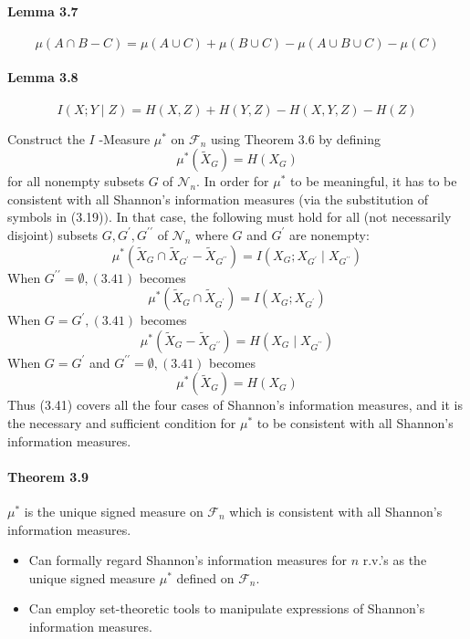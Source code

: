 \documentclass[8pt]{article}
\begin{document}
\paragraph{Lemma 3.7}
$$
\mu(A \cap B-C)=\mu(A \cup C)+\mu(B \cup C)-\mu(A \cup B \cup C)-\mu(C)
$$
\paragraph{Lemma 3.8}
$$
I(X ; Y \mid Z)=H(X, Z)+H(Y, Z)-H(X, Y, Z)-H(Z)
$$

\begin{tcolorbox}
Construct the $I$ -Measure $\mu^{*}$ on $\mathcal{F}_{n}$ using Theorem 3.6 by defining
$$
\mu^{*}\left(\tilde{X}_{G}\right)=H\left(X_{G}\right)
$$
for all nonempty subsets $G$ of $\mathcal{N}_{n} .$ In order for $\mu^{*}$ to be meaningful, it has to be consistent with all Shannon's information measures (via the substitution of symbols in (3.19)$)$. In that case, the following must hold for all (not necessarily disjoint) subsets $G, G^{\prime}, G^{\prime \prime}$ of $\mathcal{N}_{n}$ where $G$ and $G^{\prime}$ are nonempty:
$$
\mu^{*}\left(\tilde{X}_{G} \cap \tilde{X}_{G^{\prime}}-\tilde{X}_{G^{\prime \prime}}\right)=I\left(X_{G} ; X_{G^{\prime}} \mid X_{G^{\prime \prime}}\right)
$$
When $G^{\prime \prime}=\emptyset,(3.41)$ becomes
$$
\mu^{*}\left(\tilde{X}_{G} \cap \tilde{X}_{G^{\prime}}\right)=I\left(X_{G} ; X_{G^{\prime}}\right)
$$
When $G=G^{\prime},(3.41)$ becomes
$$
\mu^{*}\left(\tilde{X}_{G}-\tilde{X}_{G^{\prime \prime}}\right)=H\left(X_{G} \mid X_{G^{\prime \prime}}\right)
$$
When $G=G^{\prime}$ and $G^{\prime \prime}=\emptyset,(3.41)$ becomes
$$
\mu^{*}\left(\tilde{X}_{G}\right)=H\left(X_{G}\right)
$$
Thus (3.41) covers all the four cases of Shannon's information measures, and it is the necessary and sufficient condition for $\mu^{*}$ to be consistent with all Shannon's information measures.
\end{tcolorbox}

\paragraph{Theorem 3.9} $\mu^{*}$ is the unique signed measure on $\mathcal{F}_{n}$ which is consistent with all Shannon's information measures.
\begin{itemize}
	\item Can formally regard Shannon's information measures for $n$ r.v.'s as the unique signed measure $\mu^{*}$ defined on $\mathcal{F}_{n}$.
	\item Can employ set-theoretic tools to manipulate expressions of Shannon's information measures.
\end{itemize}
\end{document}
